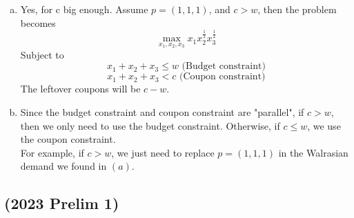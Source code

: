\documentclass{article}
\begin{document}
\begin{enumerate}[(a)]
    \item 
    Yes, for c big enough. Assume $p = (1,1,1)$, and $c>w$, then the problem becomes 
            \[\max_{x_1,x_2,x_3} x_1 x_2^{\frac{1}{2}} x_3^{\frac{1}{2}}\]
    Subject to
    \[x_1 +x_2 +x_3 \leq w \text{ (Budget constraint)}\]
    \[x_1+x_2+x_3 < c \text{ (Coupon constraint)}\]
    The leftover coupons will be $c-w$.
    \item 
    Since the budget constraint and coupon constraint are "parallel", if $c>w$, then we only need to use the budget constraint. Otherwise, if $c \leq w$, we use the coupon constraint.\\
    For example, if $c>w$, we just need to replace $p = (1,1,1)$ in the Walrasian demand we found in $(a)$.
\end{enumerate}

\subsection*{(2023 Prelim 1)}
\end{document}

